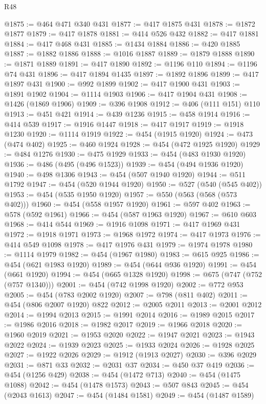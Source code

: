 \begin{lexlean}{R48}
\begin{coremodule}
@1875 := @464 @471 @340 @431
@1877 := @417 @1875 @431
@1878 := @1872 @1877
@1879 := @417 @1878
@1881 := @414 @526 @432
@1882 := @417 @1881
@1884 := @417 @468 @431
@1885 := @1434 @1884
@1886 := @420 @1885
@1887 := @1882 @1886
@1888 := @1016 @1887
@1889 := @1879 @1888
@1890 := @1871 @1889
@1891 := @417 @1890
@1892 := @1196 @110
@1894 := @1196 @74 @431
@1896 := @417 @1894 @1435
@1897 := @1892 @1896
@1899 := @417 @1897 @431
@1900 := @992 @1899
@1902 := @417 @1900 @431
@1903 := @1891 @1902
@1904 := @1114 @1903
@1906 := @417 @1904 @431
@1908 := @1426 (@1869 @1906)
@1909 := @396 @1908
@1912 := @406 (@111 @151) @110
@1913 := @451 @421
@1914 := @439 @1236
@1915 := @458 @1914
@1916 := @414 @539
@1917 := @1916 @1447
@1918 := @417 @1917
@1919 := @1918 @1230
@1920 := @1114 @1919
@1922 := @454 (@1915 @1920)
@1924 := @473 (@474 @402)
@1925 := @460 @1924
@1928 := @454 (@472 @1925 @1920)
@1929 := @484 @1276
@1930 := @475 @1929
@1933 := @454 (@483 @1930 @1920)
@1936 := @486 (@495 (@496 @1523))
@1939 := @454 (@494 @1936 @1920)
@1940 := @498 @1306
@1943 := @454 (@507 @1940 @1920)
@1944 := @511 @1792
@1947 := @454 (@520 @1944 @1920)
@1950 := @527 (@540 (@545 @402))
@1953 := @454 (@535 @1950 @1920)
@1957 := @550 (@563 (@568 (@573 @402)))
@1960 := @454 (@558 @1957 @1920)
@1961 := @597 @402
@1963 := @578 (@592 @1961)
@1966 := @454 (@587 @1963 @1920)
@1967 := @610 @603
@1968 := @414 @544
@1969 := @1916 @1098
@1971 := @417 @1969 @431
@1972 := @1918 @1971
@1973 := @1968 @1972
@1974 := @417 @1973
@1976 := @414 @549 @1098
@1978 := @417 @1976 @431
@1979 := @1974 @1978
@1980 := @1114 @1979
@1982 := @454 (@1967 @1980)
@1983 := @615 @925
@1986 := @454 (@621 @1983 @1920)
@1989 := @454 (@644 @936 @1920)
@1991 := @454 (@661 @1920)
@1994 := @454 (@665 @1328 @1920)
@1998 := @675 (@747 (@752 (@757 @1340)))
@2001 := @454 (@742 @1998 @1920)
@2002 := @772 @953
@2005 := @454 (@783 @2002 @1920)
@2007 := @798 (@811 @402)
@2011 := @454 (@806 @2007 @1920) @822
@2012 := @2005 @2011
@2013 := @2001 @2012
@2014 := @1994 @2013
@2015 := @1991 @2014
@2016 := @1989 @2015
@2017 := @1986 @2016
@2018 := @1982 @2017
@2019 := @1966 @2018
@2020 := @1960 @2019
@2021 := @1953 @2020
@2022 := @1947 @2021
@2023 := @1943 @2022
@2024 := @1939 @2023
@2025 := @1933 @2024
@2026 := @1928 @2025
@2027 := @1922 @2026
@2029 := @1912 (@1913 @2027)
@2030 := @396 @2029
@2031 := @871 @33
@2032 := @2031 @37
@2034 := @450 @37 @419
@2036 := @454 (@1256 @429)
@2038 := @454 (@1472 @713)
@2040 := @454 (@1475 @1088)
@2042 := @454 (@1478 @1573)
@2043 := @507 @843
@2045 := @454 (@2043 @1613)
@2047 := @454 (@1484 @1581)
@2049 := @454 (@1487 @1589)

\end{coremodule}
\end{lexlean}
